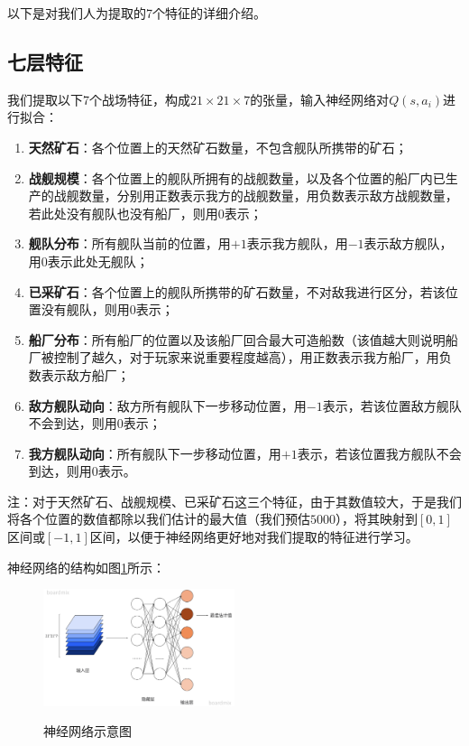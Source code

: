\documentclass[10pt]{article}
\begin{document}
以下是对我们人为提取的7个特征的详细介绍。

\subsection{七层特征}

我们提取以下7个战场特征，构成$21\times 21 \times 7$的张量，输入神经网络对$Q(s,a_i)$进行拟合：
\begin{enumerate}
	\item \textbf{天然矿石}：各个位置上的天然矿石数量，不包含舰队所携带的矿石；
	\item \textbf{战舰规模}：各个位置上的舰队所拥有的战舰数量，以及各个位置的船厂内已生产的战舰数量，分别用正数表示我方的战舰数量，用负数表示敌方战舰数量，
				若此处没有舰队也没有船厂，则用0表示；
	\item \textbf{舰队分布}：所有舰队当前的位置，用$+1$表示我方舰队，用$-1$表示敌方舰队，用$0$表示此处无舰队；
	\item \textbf{已采矿石}：各个位置上的舰队所携带的矿石数量，不对敌我进行区分，若该位置没有舰队，则用$0$表示；
	\item \textbf{船厂分布}：所有船厂的位置以及该船厂回合最大可造船数（该值越大则说明船厂被控制了越久，对于玩家来说重要程度越高），用正数表示我方船厂，用负数表示敌方船厂；
	\item \textbf{敌方舰队动向}：敌方所有舰队下一步移动位置，用$-1$表示，若该位置敌方舰队不会到达，则用$0$表示；
	\item \textbf{我方舰队动向}：所有舰队下一步移动位置，用$+1$表示，若该位置我方舰队不会到达，则用$0$表示。
\end{enumerate}

注：对于天然矿石、战舰规模、已采矿石这三个特征，由于其数值较大，于是我们
将各个位置的数值都除以我们估计的最大值（我们预估$5000$），将其映射到$[0,1]$区间或$[-1,1]$区间，以便于神经网络更好地对我们提取的特征进行学习。

神经网络的结构如图\ref{network}所示：
\begin{figure}[H]
	\centering
	{\includegraphics[width=0.5\textwidth]{image//神经网络示意图.png}} 
	\caption{神经网络示意图} \label{network} 
\end{figure}
\end{document}
